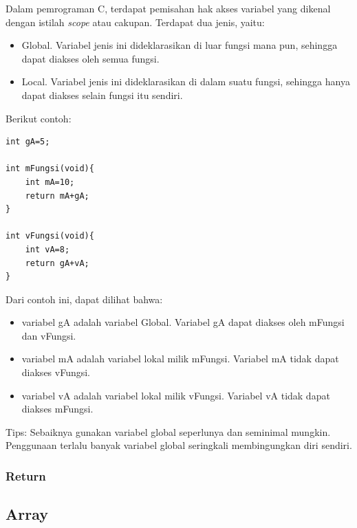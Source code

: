 \documentclass[12pt,]{article}
\begin{document}
	Dalam pemrograman C, terdapat pemisahan hak akses variabel yang dikenal dengan istilah \textit{scope} atau cakupan.
	Terdapat dua jenis, yaitu:
	\begin{itemize}
		\item Global. Variabel jenis ini dideklarasikan di luar fungsi mana pun, sehingga dapat diakses oleh semua fungsi.
		\item Local. Variabel jenis ini dideklarasikan di dalam suatu fungsi, sehingga hanya dapat diakses selain fungsi itu sendiri.
	\end{itemize}
	 Berikut contoh:
	 \begin{verbatim}
int gA=5;

int mFungsi(void){
	int mA=10;
	return mA+gA;
}

int vFungsi(void){
	int vA=8;
	return gA+vA;
}
	 \end{verbatim}

	 Dari contoh ini, dapat dilihat bahwa:
	 \begin{itemize}
	 	\item variabel gA adalah variabel Global.
	 	Variabel gA dapat diakses oleh mFungsi dan vFungsi.

	 	\item variabel mA adalah variabel lokal milik mFungsi.
	 	Variabel mA tidak dapat diakses vFungsi.

	 	\item variabel vA adalah variabel lokal milik vFungsi.
	 	Variabel vA tidak dapat diakses mFungsi.
	 \end{itemize}

 	Tips: Sebaiknya gunakan variabel global seperlunya dan seminimal mungkin.
 	Penggunaan terlalu banyak variabel global seringkali membingungkan diri sendiri.

 	\subsubsection{Return}

	\newpage
	\subsection{Array}
\end{document}
